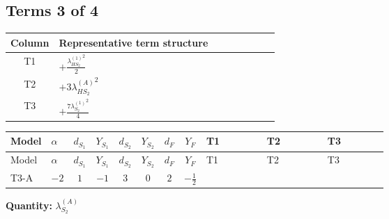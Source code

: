 \documentclass[8pt]{article}
\begin{document}
\begin{landscape}
\subsection*{Terms 3 of 4}
\begin{center}
\begin{tabular}{@{}c >{\raggedright\arraybackslash}p{0.82\linewidth}@{}}
\toprule
Column & Representative term structure \\
\midrule
T1 & \(\displaystyle +\frac{{\lambda_{HS_2}^{(1)}}^2}{2}\) \\
\midrule
T2 & \(\displaystyle +3 {\lambda_{HS_2}^{(A)}}^2\) \\
\midrule
T3 & \(\displaystyle +\frac{7 {\lambda_{S_2}^{(1)}}^2}{4}\) \\
\midrule
\bottomrule
\end{tabular}
\end{center}
\smallskip
\tiny
\begin{longtable}{@{}llcccccc >{\raggedright\arraybackslash}p{0.21\linewidth} >{\raggedright\arraybackslash}p{0.21\linewidth} >{\raggedright\arraybackslash}p{0.21\linewidth}@{}}
\toprule
Model & $\alpha$ & $d_{S_1}$ & $Y_{S_1}$ & $d_{S_2}$ & $Y_{S_2}$ & $d_F$ & $Y_F$ & T1 & T2 & T3 \\
\midrule
\endfirsthead
\toprule
Model & $\alpha$ & $d_{S_1}$ & $Y_{S_1}$ & $d_{S_2}$ & $Y_{S_2}$ & $d_F$ & $Y_F$ & T1 & T2 & T3 \\
\midrule
\endhead
T3-A & $-2$ & $1$ & $-1$ & $3$ & $0$ & $2$ & $-\frac{1}{2}$ & \scriptsize\adjustbox{max width=\linewidth}{$\begin{gathered} +\frac{{\lambda_{HS_2}^{(1)}}^2}{2}\end{gathered}$} & \scriptsize\adjustbox{max width=\linewidth}{$\begin{gathered} +3 {\lambda_{HS_2}^{(A)}}^2\end{gathered}$} & \scriptsize\adjustbox{max width=\linewidth}{$\begin{gathered} +\frac{7 {\lambda_{S_2}^{(1)}}^2}{4}\end{gathered}$} \\
\midrule
\bottomrule
\end{longtable}
\clearpage
\noindent\textbf{Quantity: }$\lambda_{S_2}^{(A)}$\par\smallskip

\end{landscape}
\end{document}
